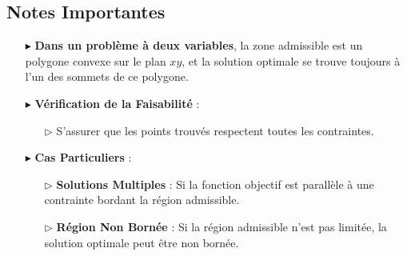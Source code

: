 \documentclass{report}
\begin{document}
\begin{multicols*}{2}
\begin{center}
\end{center}

\subsection{Notes Importantes}
\begin{itemize}
    \item[$\blacktriangleright$] \textbf{Dans un problème à deux variables}, la zone admissible est un polygone convexe sur le plan $xy$, et la solution optimale se trouve toujours à l'un des sommets de ce polygone.

    \item[$\blacktriangleright$] \textbf{Vérification de la Faisabilité} :
    \begin{itemize}
        \item[$\rhd$] S'assurer que les points trouvés respectent toutes les contraintes.
    \end{itemize}

    \item[$\blacktriangleright$] \textbf{Cas Particuliers} :
    \begin{itemize}
        \item[$\rhd$] \textbf{Solutions Multiples} : Si la fonction objectif est parallèle à une contrainte bordant la région admissible.
        \item[$\rhd$] \textbf{Région Non Bornée} : Si la région admissible n'est pas limitée, la solution optimale peut être non bornée.
    \end{itemize}
\end{itemize}

\end{multicols*}
\end{document}
